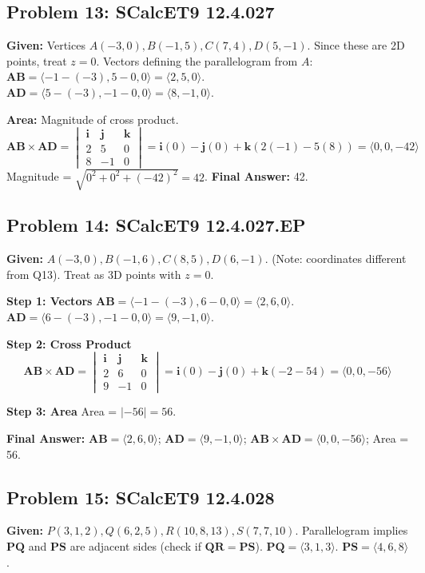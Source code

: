 \documentclass[11pt]{article}
\renewcommand{\vec}[1]{\mathbf{#1}}
\newcommand{\ihat}{\mathbf{i}}
\newcommand{\jhat}{\mathbf{j}}
\newcommand{\khat}{\mathbf{k}}
\begin{document}
\hrulefill

\subsection*{Problem 13: SCalcET9 12.4.027}
\textbf{Given:} Vertices $A(-3, 0), B(-1, 5), C(7, 4), D(5, -1)$.
Since these are 2D points, treat $z = 0$.
Vectors defining the parallelogram from $A$:
$\vec{AB} = \langle -1 - (-3), 5 - 0, 0 \rangle = \langle 2, 5, 0 \rangle$.
$\vec{AD} = \langle 5 - (-3), -1 - 0, 0 \rangle = \langle 8, -1, 0 \rangle$.

\textbf{Area:} Magnitude of cross product.
\[
\vec{AB} \times \vec{AD} = \begin{vmatrix} \ihat & \jhat & \khat \\ 2 & 5 & 0 \\ 8 & -1 & 0 \end{vmatrix} = \ihat(0) - \jhat(0) + \khat(2(-1) - 5(8)) = \langle 0, 0, -42 \rangle
\]
Magnitude = $\sqrt{0^2 + 0^2 + (-42)^2} = 42$.
\textbf{Final Answer:} 42.

\hrulefill

\subsection*{Problem 14: SCalcET9 12.4.027.EP}
\textbf{Given:} $A(-3, 0), B(-1, 6), C(8, 5), D(6, -1)$. (Note: coordinates different from Q13).
Treat as 3D points with $z=0$.

\textbf{Step 1: Vectors}
$\vec{AB} = \langle -1 - (-3), 6 - 0, 0 \rangle = \langle 2, 6, 0 \rangle$.
$\vec{AD} = \langle 6 - (-3), -1 - 0, 0 \rangle = \langle 9, -1, 0 \rangle$.

\textbf{Step 2: Cross Product}
\[
\vec{AB} \times \vec{AD} = \begin{vmatrix} \ihat & \jhat & \khat \\ 2 & 6 & 0 \\ 9 & -1 & 0 \end{vmatrix} = \ihat(0) - \jhat(0) + \khat(-2 - 54) = \langle 0, 0, -56 \rangle
\]

\textbf{Step 3: Area}
Area = $|-56| = 56$.

\textbf{Final Answer:}
$\vec{AB} = \langle 2, 6, 0 \rangle$; $\vec{AD} = \langle 9, -1, 0 \rangle$;
$\vec{AB} \times \vec{AD} = \langle 0, 0, -56 \rangle$; Area = 56.

\hrulefill

\subsection*{Problem 15: SCalcET9 12.4.028}
\textbf{Given:} $P(3, 1, 2), Q(6, 2, 5), R(10, 8, 13), S(7, 7, 10)$.
Parallelogram implies $\vec{PQ}$ and $\vec{PS}$ are adjacent sides (check if $\vec{QR} = \vec{PS}$).
$\vec{PQ} = \langle 3, 1, 3 \rangle$.
$\vec{PS} = \langle 4, 6, 8 \rangle$.
\end{document}

